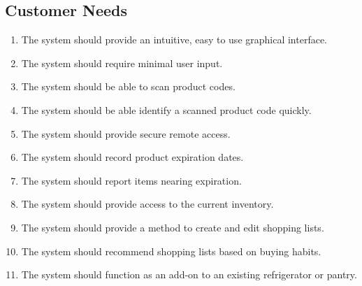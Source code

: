 \documentclass[11pt,letterpaper]{article}
\begin{document}
\subsection{Customer Needs}
\begin{enumerate}
\item The system should provide an intuitive, easy to use graphical interface.
\item The system should require minimal user input.
\item The system should be able to scan product codes.
\item The system should be able identify a scanned product code quickly.
\item The system should provide secure remote access.
\item The system should record product expiration dates.
\item The system should report items nearing expiration.
\item The system should provide access to the current inventory.
\item The system should provide a method to create and edit shopping lists.
\item The system should recommend shopping lists based on buying habits.
\item The system should function as an add-on to an existing refrigerator or pantry.
\end{enumerate}
\pagebreak
\end{document}
